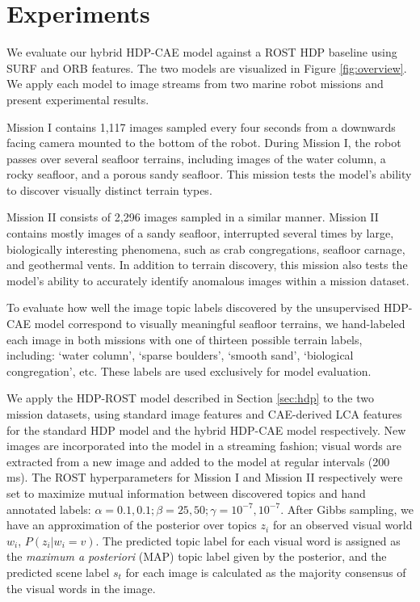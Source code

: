 \documentclass[letterpaper, 10 pt, conference]{ieeeconf}
\begin{document}
\section{Experiments}
\label{sec:exp}

We evaluate our hybrid HDP-CAE model against a ROST HDP baseline using SURF \cite{Bay:ECCV:2006} and ORB \cite{RubleeE2011} features. The two models are visualized in Figure \ref{fig:overview}. We apply each model to image streams from two marine robot missions \cite{Pineda2016} and present experimental results.  

Mission I contains 1,117 images sampled every four seconds from a downwards facing camera mounted to the bottom of the robot. During Mission I, the robot passes over several seafloor terrains, including images of the water column, a rocky seafloor, and a porous sandy seafloor. This mission tests the model's ability to discover visually distinct terrain types. 

Mission II consists of 2,296 images sampled in a similar manner. Mission II contains mostly images of a sandy seafloor, interrupted several times by large, biologically interesting phenomena, such as crab congregations, seafloor carnage, and geothermal vents. In addition to terrain discovery, this mission also tests the model's ability to accurately identify anomalous images within a mission dataset.

To evaluate how well the image topic labels discovered by the unsupervised HDP-CAE model correspond to visually meaningful seafloor terrains, we hand-labeled each image in both missions with one of thirteen possible terrain labels, including: `water column', `sparse boulders', `smooth sand', `biological congregation', etc. These labels are used exclusively for model evaluation. 

We apply the HDP-ROST model described in Section \ref{sec:hdp} to the two mission datasets, using standard image features and CAE-derived LCA features for the standard HDP model and the hybrid HDP-CAE model respectively. New images are incorporated into the model in a streaming fashion; visual words are extracted from a new image and added to the model at regular intervals (200 ms). The ROST hyperparameters for Mission I and Mission II respectively were set to maximize mutual information between discovered topics and hand annotated labels: $\alpha = 0.1, 0.1; \beta = 25, 50; \gamma = 10^{-7}, 10^{-7}$. After Gibbs sampling, we have an approximation of the posterior over topics $z_i$ for an observed visual world $w_i$, $P(z_i | w_i = v)$.  The predicted topic label for each visual word is assigned as the \textit{maximum a posteriori} (MAP) topic label given by the posterior, and the predicted scene label $s_t$ for each image is calculated as the majority consensus of the visual words in the image.
\end{document}
